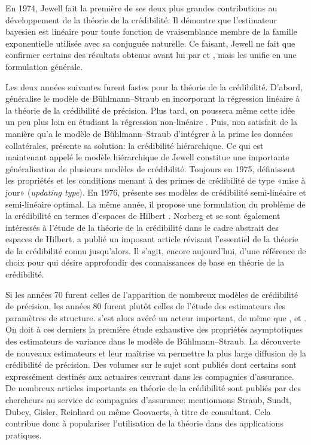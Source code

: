 En 1974, Jewell fait la première de ses deux plus grandes
contributions au développement de la théorie de la crédibilité. Il
démontre \citep{Jewell:exact:1974} que l'estimateur bayesien est
linéaire pour toute fonction de vraisemblance membre de la famille
exponentielle utilisée avec sa conjuguée naturelle. Ce faisant, Jewell
ne fait que confirmer certains des résultats obtenus avant lui par
\cite{Bailey:1950} et \cite{Mayerson:bayesian:1964}, mais les unifie
en une formulation générale.

Les deux années suivantes furent fastes pour la théorie de la
crédibilité. D'abord, \cite{Hachemeister:1975} généralise le modèle de
Bühlmann--Straub en incorporant la régression linéaire à la théorie de
la crédibilité de précision. Plus tard, on poussera même cette idée un
peu plus loin en étudiant la régression non-linéaire
\citep{DeVylder:non-linear:1985}. Puis, non satisfait de la manière
qu'a le modèle de Bühlmann--Straub d'intégrer à la prime les données
collatérales, \cite{Jewell:hierarchical:1975} présente sa solution: la
crédibilité hiérarchique. Ce qui est maintenant appelé le modèle
hiérarchique de Jewell constitue une importante généralisation de
plusieurs modèles de crédibilité. Toujours en 1975,
\cite{Gerber:updating:1975} définissent les propriétés et les
conditions menant à des primes de crédibilité de type «mise à jour»
(\emph{updating type}). En 1976, \citep{DeVylder:semilinear:1976}
présente ses modèles de crédibilité semi-linéaire et semi-linéaire
optimal. La même année, il propose une formulation du problème de la
crédibilité en termes d'espaces de Hilbert
\citep{DeVylder:geometrical:1976}. Norberg et
\cite{Taylor:abstractcredibility:1977} se sont également intéressés à
l'étude de la théorie de la crédibilité dans le cadre abstrait des
espaces de Hilbert. \cite{Norberg:credibility:1979} a publié un imposant
article révisant l'essentiel de la théorie de la crédibilité connu
jusqu'alors. Il s'agit, encore aujourd'hui, d'une référence de choix
pour qui désire approfondir des connaissances de base en théorie de la
crédibilité.

Si les années 70 furent celles de l'apparition de nombreux modèles de
crédibilité de précision, les années 80 furent plutôt celles de
l'étude des estimateurs des paramètres de structure.
\cite{DeVylder:estimation:1978,DeVylder:estimation:1981,DeVylder:estimation:PCiI:1984}
s'est alors avéré un acteur important, de même que
\cite{Norberg:empiricalbayes:1980}, \cite{Gisler:trimming:1980} et
\cite{Dubey:estimation:1981}. On doit à ces derniers la première étude
exhaustive des propriétés asymptotiques des estimateurs de variance
dans le modèle de Bühlmann--Straub. La découverte de nouveaux
estimateurs et leur maîtrise va permettre la plus large diffusion de
la crédibilité de précision. Des volumes sur le sujet sont publiés
\citep{Goovaerts:EAM:1990} dont certains
\citep{Goovaerts:credibility:1987} sont expressément destinés aux
actuaires {\oe}uvrant dans les compagnies d'assurance. De nombreux
articles importants en théorie de la crédibilité sont publiés par des
chercheurs au service de compagnies d'assurance: mentionnons Straub,
Sundt, Dubey, Gisler, Reinhard ou même Goovaerts, à titre de
consultant. Cela contribue donc à populariser l'utilisation de la
théorie dans des applications pratiques.

